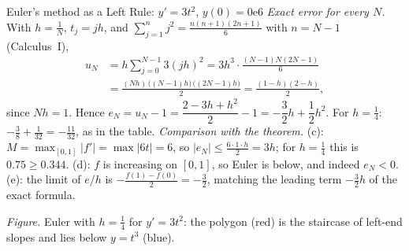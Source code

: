 \documentclass[11pt]{article}
\begin{document}
\begin{exmp}{Euler's method as a Left Rule: $y'=3t^2$, $y(0)=0$}{e6}
\emph{Exact error for every $N$.} With $h=\frac1N$, $t_j=jh$, and $\sum_{j=1}^{n}j^2=\frac{n(n+1)(2n+1)}6$ with $n=N-1$ (Calculus~I),
\[
\begin{aligned}
u_N&=h\sum_{j=0}^{N-1}3(jh)^2=3h^3\cdot\frac{(N-1)N(2N-1)}6\\
&=\frac{(Nh)\,\big((N-1)h\big)\,\big((2N-1)h\big)}{2}=\frac{(1-h)(2-h)}2 ,
\end{aligned}
\]
since $Nh=1$. Hence $e_N=u_N-1=\dfrac{2-3h+h^2}2-1=-\dfrac32h+\dfrac12h^2$. For $h=\frac14$: $-\frac38+\frac1{32}=-\frac{11}{32}$, as in the table.
\emph{Comparison with the theorem.} (c): $M=\max_{[0,1]}\lvert f'\rvert=\max\lvert6t\rvert=6$, so $\lvert e_N\rvert\le\frac{6\cdot1\cdot h}2=3h$; for $h=\frac14$ this is $0.75\ge0.344$. (d): $f$ is increasing on $[0,1]$, so Euler is below, and indeed $e_N<0$. (e): the limit of $e/h$ is $-\frac{f(1)-f(0)}2=-\frac32$, matching the leading term $-\frac32h$ of the exact formula.
\begin{center}
\par\small\emph{Figure.} Euler with $h=\frac14$ for $y'=3t^2$: the polygon (red) is the staircase of left-end slopes and lies below $y=t^3$ (blue).
\end{center}
\end{exmp}
\end{document}
